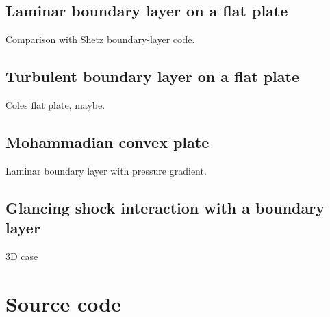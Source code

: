 \documentclass[12pt,a4paper,twoside]{article}
\newcommand{\code}[2]{
 \hrulefill
 \scriptsize
 
 \hrulefill
 \vspace{2em}
 \normalsize
}
\begin{document}
\subsection{Laminar boundary layer on a flat plate}
%
Comparison with Shetz boundary-layer code.


\subsection{Turbulent boundary layer on a flat plate}
%
Coles flat plate, maybe.


\subsection{Mohammadian convex plate}
%
Laminar boundary layer with pressure gradient.


\subsection{Glancing shock interaction with a boundary layer}
%
3D case


\clearpage



\clearpage
\appendix
\section{Source code}

\noindent
\code{}{../../../app/eilmer3/source/e3march.py}

\clearpage
{} %
\printindex
\end{document}
